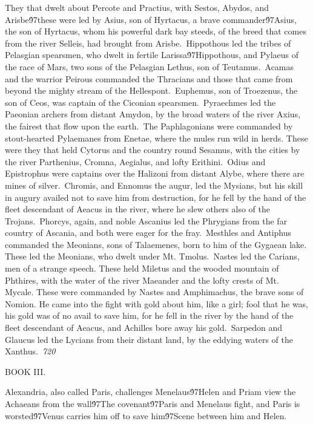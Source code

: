 {They that dwelt about Percote and Practius, with Sestos, Abydos, and Arisbe\'97these were led by Asius, son of Hyrtacus, a brave commander\'97Asius, the son of Hyrtacus, whom his powerful dark bay steeds, of the breed that comes from the river Selleis, had brought from Arisbe.\
Hippothous led the tribes of Pelasgian spearsmen, who dwelt in fertile Larissa\'97Hippothous, and Pylaeus of the race of Mars, two sons of the Pelasgian Lethus, son of Teutamus.\
Acamas and the warrior Peirous commanded the Thracians and those that came from beyond the mighty stream of the Hellespont.\
Euphemus, son of Troezenus, the son of Ceos, was captain of the Ciconian spearsmen.\
Pyraechmes led the Paeonian archers from distant Amydon, by the broad waters of the river Axius, the fairest that flow upon the earth.\
The Paphlagonians were commanded by stout-hearted Pylaemanes from Enetae, where the mules run wild in herds. These were they that held Cytorus and the country round Sesamus, with the cities by the river Parthenius, Cromna, Aegialus, and lofty Erithini.\
Odius and Epistrophus were captains over the Halizoni from distant Alybe, where there are mines of silver.\
Chromis, and Ennomus the augur, led the Mysians, but his skill in augury availed not to save him from destruction, for he fell by the hand of the fleet descendant of Aeacus in the river, where he slew others also of the Trojans.\
Phorcys, again, and noble Ascanius led the Phrygians from the far country of Ascania, and both were eager for the fray.\
Mesthles and Antiphus commanded the Meonians, sons of Talaemenes, born to him of the Gygaean lake. These led the Meonians, who dwelt under Mt. Tmolus.\
Nastes led the Carians, men of a strange speech. These held Miletus and the wooded mountain of Phthires, with the water of the river Maeander and the lofty crests of Mt. Mycale. These were commanded by Nastes and Amphimachus, the brave sons of Nomion. He came into the fight with gold about him, like a girl; fool that he was, his gold was of no avail to save him, for he fell in the river by the hand of the fleet descendant of Aeacus, and Achilles bore away his gold.\
Sarpedon and Glaucus led the Lycians from their distant land, by the eddying waters of the Xanthus.\
\pard{}\sl720\qc{}

\fs48 \cf2 BOOK III.\
\pard{}\li1710\ri1710\sa64\qj\partightenfactor0

\fs25\fsmilli12800 \cf2 Alexandria, also called Paris, challenges Menelaus\'97Helen and Priam view the Achaeans from the wall\'97The covenant\'97Paris and Menelaus fight, and Paris is worsted\'97Venus carries him off to save him\'97Scene between him and Helen.\
\pard\pardeftab720\qj{}

}
